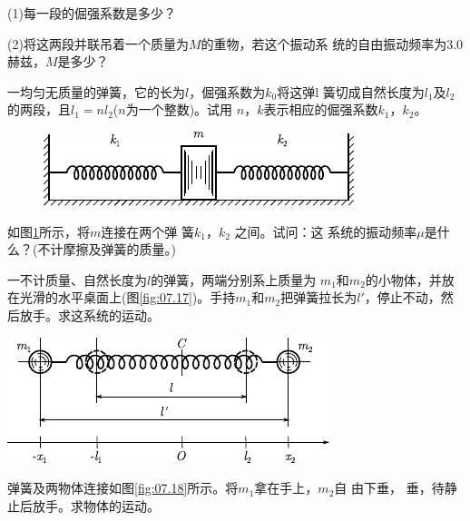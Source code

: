 \begin{exercises}
(1)每一段的倔强系数是多少？

(2)将这两段并联吊着一个质量为$ M $的重物，若这个振动系
统的自由振动频率为$ 3.0 $赫兹，$ M $是多少？

\exercise 一均匀无质量的弹簧，它的长为$ l $，倔强系数为$ k _ { 0 } $将这弹l
簧切成自然长度为$ l _ { 1 } $及$ l _ { 2 } $的两段，且$ l _ { 1 } = n l _ { 2 } $($ n $为一个整数)。试用
$ n $，$ k $表示相应的倔强系数$ k _ { 1 } $，$ k _ { 2 } $。

\begin{figure}
    \centering
    \includegraphics{figure/fig07.16}
    \caption{}
    \label{fig:07.16}
\end{figure}
\exercise 如图\ref{fig:07.16}\;所示，将$ m $连接在两个弹
簧$ k _ { 1 } $，$ k _ { 2 } $ 之间。试问：这
系统的振动频率$ \mu $是什么？(不计摩擦及弹簧的质量。)

\exercise 一不计质量、自然长度为$ l $的弹簧，两端分别系上质量为
$ m _ { 1 } $和$ m _ { 2 } $的小物体，并放在光滑的水平桌面上(图\ref{fig:07.17})。手持$ m _ { 1 } $和$ m _ { 2 } $把弹簧拉长为$ l' $，停止不动，然后放手。求这系统的运动。
\begin{figurex}
    \centering
    \includegraphics{figure/fig07.17}
    \caption{}
    \label{fig:07.17}
\end{figurex}

\exercise 弹簧及两物体连接如图\ref{fig:07.18}\;所示。将$ m _ 1 $拿在手上，$ m _ 2 $自
由下垂，
垂，待静止后放手。求物体的运动。


\end{exercises}
